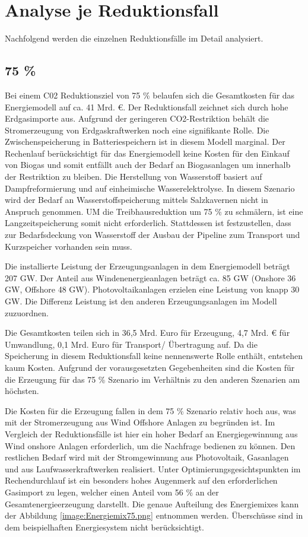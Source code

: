\section{Analyse je Reduktionsfall}
Nachfolgend werden die einzelnen Reduktionsfälle im Detail analysiert.

\subsection{75 \%}
Bei einem C02 Reduktionsziel von 75 \% belaufen sich die Gesamtkosten für das Energiemodell auf ca. 41 Mrd. €. Der Reduktionsfall zeichnet sich durch hohe Erdgasimporte aus. Aufgrund der geringeren CO2-Restriktion behält die Stromerzeugung von Erdgaskraftwerken noch eine signifikante Rolle. Die Zwischenspeicherung in Batteriespeichern ist in diesem Modell marginal. Der Rechenlauf berücksichtigt für das Energiemodell keine Kosten für den Einkauf von Biogas und somit entfällt auch der Bedarf an Biogasanlagen um innerhalb der Restriktion zu bleiben. 
\newline
Die Herstellung von Wasserstoff basiert auf Dampfreformierung und auf einheimische Wasserelektrolyse. In diesem Szenario wird der Bedarf an Wasserstoffspeicherung mittels Salzkavernen nicht in Anspruch genommen. UM die Treibhausreduktion um 75 \% zu schmälern, ist eine Langzeitspeicherung somit nicht erforderlich. Stattdessen ist festzustellen, dass zur Bedarfsdeckung von Wasserstoff der Ausbau der Pipeline zum Transport und Kurzspeicher vorhanden sein muss. 

Die installierte Leistung der Erzeugungsanlagen in dem Energiemodell beträgt 207 GW.  Der Anteil aus Windenenergieanlagen beträgt ca. 85 GW (Onshore 36 GW, Offshore 48 GW). Photovoltaikanlagen erzielen eine Leistung von knapp 30 GW. Die Differenz Leistung ist den anderen Erzeugungsanlagen im Modell zuzuordnen. 

Die Gesamtkosten teilen sich in 36,5 Mrd. Euro für Erzeugung, 4,7 Mrd. € für Umwandlung, 0,1 Mrd. Euro für Transport/ Übertragung auf. Da die Speicherung in diesem Reduktionsfall keine nennenswerte Rolle enthält, entstehen kaum Kosten. Aufgrund der vorausgesetzten Gegebenheiten sind die Kosten für die Erzeugung für das 75 \% Szenario im Verhältnis zu den anderen Szenarien am höchsten. 

Die Kosten für die Erzeugung fallen in dem 75 \% Szenario relativ hoch aus, was mit der Stromerzeugung aus Wind Offshore Anlagen zu begründen ist. Im Vergleich der Reduktionsfälle ist hier ein hoher Bedarf an Energiegewinnung aus Wind onshore Anlagen erforderlich, um die Nachfrage bedienen zu können. Den restlichen Bedarf wird mit der Stromgewinnung aus Photovoltaik, Gasanlagen und aus Laufwasserkraftwerken realisiert. Unter Optimierungsgesichtspunkten im Rechendurchlauf ist ein besonders hohes Augenmerk auf den erforderlichen Gasimport zu legen, welcher einen Anteil vom 56 \% an der Gesamtenergieerzeugung darstellt. Die genaue Aufteilung des Energiemixes kann der Abbildung \ref{image:Energiemix75.png} entnommen werden. Überschüsse sind in dem beispielhaften Energiesystem nicht berücksichtigt.
 

